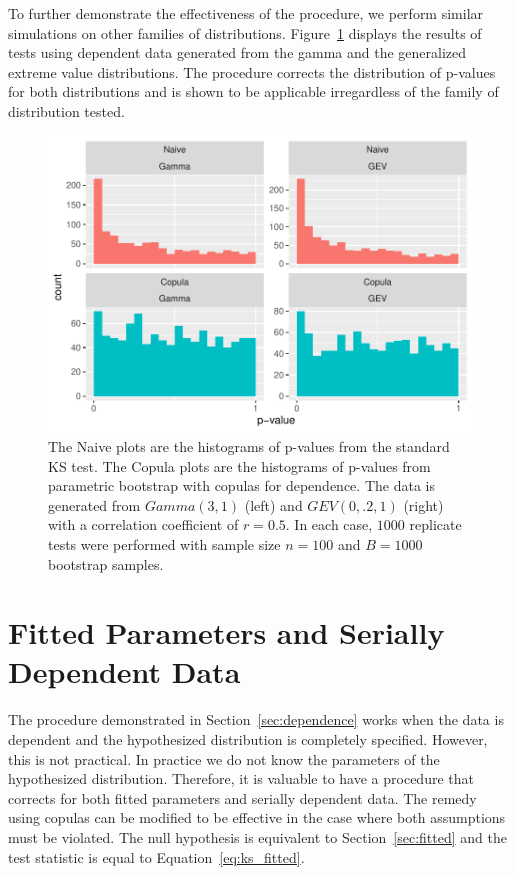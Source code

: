 \documentclass[12pt, letterpaper, titlepage]{article}
\begin{document}
To further demonstrate the effectiveness of the procedure, we perform similar 
simulations on other families of distributions. 
Figure~\ref{fig:hist_gamma_gev_D} displays the results of tests using dependent 
data generated from the gamma and the generalized extreme value distributions.
The procedure corrects the distribution of p-values for both distributions and 
is shown to be applicable irregardless of the family of distribution tested.

\begin{figure}[tbp]
  \centering
  \includegraphics{hist_gamma_gev_D}
  \caption{The Naive plots are the histograms of p-values from the standard KS 
  test. The Copula plots are the histograms of p-values from parametric 
  bootstrap with copulas for dependence. The data is generated from $Gamma(3, 
  1)$ (left) and $GEV(0, .2, 1)$ (right) with a correlation coefficient of $r = 
  0.5$. In each case, $1000$ replicate tests were performed with sample size $n 
  = 100$ and $B = 1000$ bootstrap samples.}
  \label{fig:hist_gamma_gev_D}
\end{figure}

\section{Fitted Parameters and Serially Dependent Data}
\label{sec:fittedwithdependence}

The procedure demonstrated in Section~\ref{sec:dependence} works when the data 
is dependent and the hypothesized distribution is completely specified. However,
this is not practical. In practice we do not know the parameters of the 
hypothesized distribution. Therefore, it is valuable to have a procedure that
corrects for both fitted parameters and serially dependent data. The remedy 
using copulas can be modified to be effective in the case where both assumptions
must be violated. The null hypothesis is equivalent to Section~\ref{sec:fitted} 
and the test statistic is equal to Equation~\eqref{eq:ks_fitted}.
\end{document}
